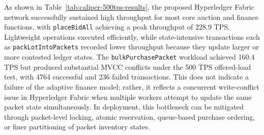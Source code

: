 \documentclass[12pt]{article}
\begin{document}
As shown in Table~\ref{tab:caliper-500tps-results}, the proposed Hyperledger Fabric network successfully sustained high throughput for most core auction and finance functions, with \texttt{placeBidAll} achieving a peak throughput of 228.9 TPS. Lightweight operations executed efficiently, while state-intensive transactions such as \texttt{packLotIntoPackets} recorded lower throughput because they update larger or more contested ledger states. The \texttt{bulkPurchasePacket} workload achieved 160.4 TPS but produced substantial MVCC conflicts under the 500 TPS offered-load test, with 4764 successful and 236 failed transactions. This does not indicate a failure of the adaptive finance model; rather, it reflects a concurrent write-conflict issue in Hyperledger Fabric when multiple workers attempt to update the same packet state simultaneously. In deployment, this bottleneck can be mitigated through packet-level locking, atomic reservation, queue-based purchase ordering, or finer partitioning of packet inventory states.
\end{document}
